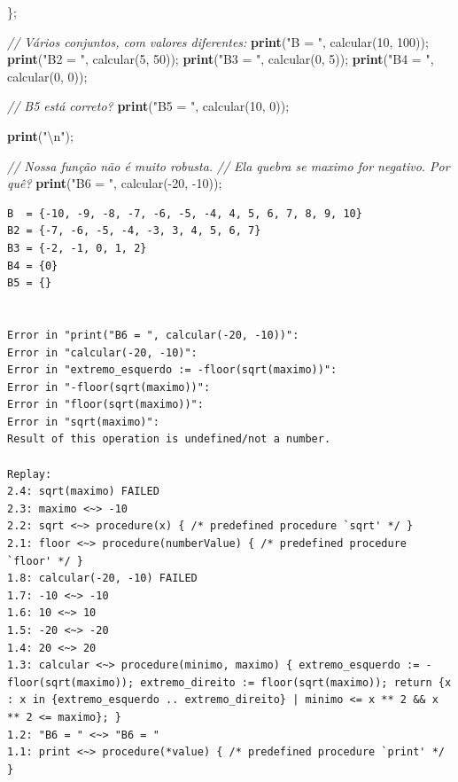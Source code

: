 \documentclass[
  letterpaper,
  DIV=11,
  numbers=noendperiod]{scrreprt}
\newenvironment{Shaded}{\begin{snugshade}}{\end{snugshade}}
\newcommand{\CommentTok}[1]{\textcolor[rgb]{0.56,0.35,0.01}{\textit{#1}}}
\newcommand{\DecValTok}[1]{\textcolor[rgb]{0.00,0.00,0.81}{#1}}
\newcommand{\KeywordTok}[1]{\textcolor[rgb]{0.13,0.29,0.53}{\textbf{#1}}}
\newcommand{\NormalTok}[1]{#1}
\newcommand{\StringTok}[1]{\textcolor[rgb]{0.31,0.60,0.02}{#1}}
\begin{document}
\begin{tcolorbox}
\begin{Shaded}
\begin{Highlighting}[]
\NormalTok{\};}

\CommentTok{// Vários conjuntos, com valores diferentes:}
\KeywordTok{print}\NormalTok{(}\StringTok{"B  = "}\NormalTok{, calcular(}\DecValTok{10}\NormalTok{, }\DecValTok{100}\NormalTok{));}
\KeywordTok{print}\NormalTok{(}\StringTok{"B2 = "}\NormalTok{, calcular(}\DecValTok{5}\NormalTok{, }\DecValTok{50}\NormalTok{));}
\KeywordTok{print}\NormalTok{(}\StringTok{"B3 = "}\NormalTok{, calcular(}\DecValTok{0}\NormalTok{, }\DecValTok{5}\NormalTok{));}
\KeywordTok{print}\NormalTok{(}\StringTok{"B4 = "}\NormalTok{, calcular(}\DecValTok{0}\NormalTok{, }\DecValTok{0}\NormalTok{));}

\CommentTok{// B5 está correto?}
\KeywordTok{print}\NormalTok{(}\StringTok{"B5 = "}\NormalTok{, calcular(}\DecValTok{10}\NormalTok{, }\DecValTok{0}\NormalTok{));}

\KeywordTok{print}\NormalTok{(}\StringTok{"\textbackslash{}n"}\NormalTok{);}

\CommentTok{// Nossa função não é muito robusta. }
\CommentTok{// Ela quebra se maximo for negativo. Por quê?}
\KeywordTok{print}\NormalTok{(}\StringTok{"B6 = "}\NormalTok{, calcular({-}}\DecValTok{20}\NormalTok{, {-}}\DecValTok{10}\NormalTok{));}
\end{Highlighting}
\end{Shaded}

\begin{verbatim}
B  = {-10, -9, -8, -7, -6, -5, -4, 4, 5, 6, 7, 8, 9, 10}
B2 = {-7, -6, -5, -4, -3, 3, 4, 5, 6, 7}
B3 = {-2, -1, 0, 1, 2}
B4 = {0}
B5 = {}


Error in "print("B6 = ", calcular(-20, -10))":
Error in "calcular(-20, -10)":
Error in "extremo_esquerdo := -floor(sqrt(maximo))":
Error in "-floor(sqrt(maximo))":
Error in "floor(sqrt(maximo))":
Error in "sqrt(maximo)":
Result of this operation is undefined/not a number.

Replay: 
2.4: sqrt(maximo) FAILED 
2.3: maximo <~> -10
2.2: sqrt <~> procedure(x) { /* predefined procedure `sqrt' */ }
2.1: floor <~> procedure(numberValue) { /* predefined procedure `floor' */ }
1.8: calcular(-20, -10) FAILED 
1.7: -10 <~> -10
1.6: 10 <~> 10
1.5: -20 <~> -20
1.4: 20 <~> 20
1.3: calcular <~> procedure(minimo, maximo) { extremo_esquerdo := -floor(sqrt(maximo)); extremo_direito := floor(sqrt(maximo)); return {x : x in {extremo_esquerdo .. extremo_direito} | minimo <= x ** 2 && x ** 2 <= maximo}; }
1.2: "B6 = " <~> "B6 = "
1.1: print <~> procedure(*value) { /* predefined procedure `print' */ }
\end{verbatim}

\end{tcolorbox}
\end{document}
